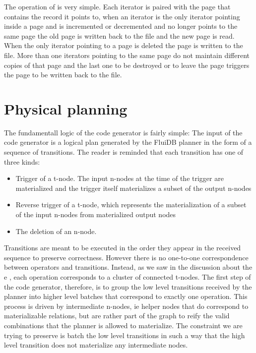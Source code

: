 The operation of  is very simple. Each iterator is paired
with the page that contains the record it points to, when an iterator
is the only iterator pointing inside a page and is incremented or
decremented and no longer points to the same page the old page is
written back to the file and the new page is read. When the only
iterator pointing to a page is deleted the page is written to the
file. More than one iterators pointing to the same page do not
maintain different copies of that page and the last one to be
destroyed or to leave the page triggers the page to be written back to
the file.
\section{Physical planning}

The fundamentall logic of the code generator is fairly simple: The
input of the code generator is a logical plan generated by the FluiDB
planner in the form of a sequence of transitions. The reader is
reminded that each transition has one of three kinds:

\begin{itemize}
\item Trigger of a t-node. The input n-nodes at the time of the trigger
are materialized and the trigger itself materializes a subset of the
output n-nodes
\item Reverse trigger of a t-node, which represents the
materialization of a subset of the input n-nodes from materialized
output nodes
\item The deletion of an n-node.
\end{itemize}

Transitions are meant to be executed in the order they appear in the
received sequence to preserve correctness. However there is no
one-to-one correspondence between operators and transitions. Instead,
as we saw in the discussion about the e , each
operation corresponds to a cluster of connected t-nodes. The first
step of the code generator, therefore, is to group the low level
transitions received by the planner into higher level batches that
correspond to exactly one operation. This process is driven by
intermediate n-nodes, ie helper nodes that do correspond to
materializable relations, but are rather part of the graph to reify
the valid combinations that the planner is allowed to materialize. The
constraint we are trying to preserve is batch the low level
transitions in such a way that the high level transition does not
materialize any intermediate nodes.

